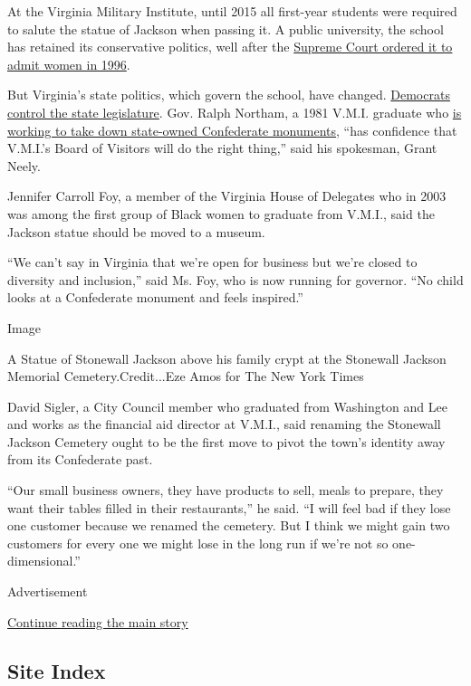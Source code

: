 At the Virginia Military Institute, until 2015 all first-year students
were required to salute the statue of Jackson when passing it. A public
university, the school has retained its conservative politics, well
after the
\href{https://www.nytimes3xbfgragh.onion/1996/09/22/us/defiant-vmi-to-admit-women-but-will-not-ease-rules-for-them.html}{Supreme
Court ordered it to admit women in 1996}.

But Virginia's state politics, which govern the school, have changed.
\href{https://www.nytimes3xbfgragh.onion/2019/11/05/us/politics/virginia-elections.html}{Democrats
control the state legislature}. Gov. Ralph Northam, a 1981 V.M.I.
graduate who
\href{https://www.nytimes3xbfgragh.onion/2020/06/03/us/robert-e-lee-statue-richmond.html}{is
working to take down state-owned Confederate monuments}, ``has
confidence that V.M.I.'s Board of Visitors will do the right thing,''
said his spokesman, Grant Neely.

Jennifer Carroll Foy, a member of the Virginia House of Delegates who in
2003 was among the first group of Black women to graduate from V.M.I.,
said the Jackson statue should be moved to a museum.

``We can't say in Virginia that we're open for business but we're closed
to diversity and inclusion,'' said Ms. Foy, who is now running for
governor. ``No child looks at a Confederate monument and feels
inspired.''

Image

A Statue of Stonewall Jackson above his family crypt at the Stonewall
Jackson Memorial Cemetery.Credit...Eze Amos for The New York Times

David Sigler, a City Council member who graduated from Washington and
Lee and works as the financial aid director at V.M.I., said renaming the
Stonewall Jackson Cemetery ought to be the first move to pivot the
town's identity away from its Confederate past.

``Our small business owners, they have products to sell, meals to
prepare, they want their tables filled in their restaurants,'' he said.
``I will feel bad if they lose one customer because we renamed the
cemetery. But I think we might gain two customers for every one we might
lose in the long run if we're not so one-dimensional.''

Advertisement

\protect\hyperlink{after-bottom}{Continue reading the main story}

\hypertarget{site-index}{%
\subsection{Site Index}\label{site-index}}

